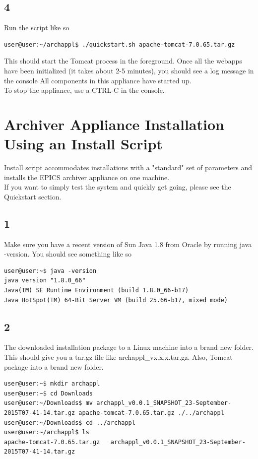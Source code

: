 \documentclass[11pt
  , a4paper
  , article
  , oneside
]{memoir}
\begin{document}
\subsection{4}
Run the script like so
\begin{lstlisting}[style=termstyle]
user@user:~/archappl$ ./quickstart.sh apache-tomcat-7.0.65.tar.gz
\end{lstlisting}
This should start the Tomcat process in the foreground. Once all the webapps have been initialized (it takes about 2-5 minutes), you should see a log message in the console All components in this appliance have started up.\\
To stop the appliance, use a CTRL-C in the console.
\section{Archiver Appliance Installation Using an Install Script}
Install script accommodates installations with a "standard" set of parameters and installs the EPICS archiver appliance on one machine.\\
If you want to simply test the system and quickly get going, please see the Quickstart section.
\subsection{1}
Make sure you have a recent version of Sun Java 1.8 from Oracle by running java -version. You should see something like so
\begin{lstlisting}[style=termstyle]
user@user:~$ java -version
java version "1.8.0_66"
Java(TM) SE Runtime Environment (build 1.8.0_66-b17)
Java HotSpot(TM) 64-Bit Server VM (build 25.66-b17, mixed mode)
\end{lstlisting}
\subsection{2}
The downloaded installation package to a Linux machine into a brand new folder. This should give you a tar.gz file like archappl\_vx.x.x.tar.gz. Also, Tomcat package into a brand new folder.
\begin{lstlisting}[style=termstyle]
user@user:~$ mkdir archappl
user@user:~$ cd Downloads
user@user:~/Downloads$ mv archappl_v0.0.1_SNAPSHOT_23-September-2015T07-41-14.tar.gz apache-tomcat-7.0.65.tar.gz ./../archappl
user@user:~/Downloads$ cd ../archappl 
user@user:~/archappl$ ls
apache-tomcat-7.0.65.tar.gz   archappl_v0.0.1_SNAPSHOT_23-September-2015T07-41-14.tar.gz
\end{lstlisting}
\end{document}
